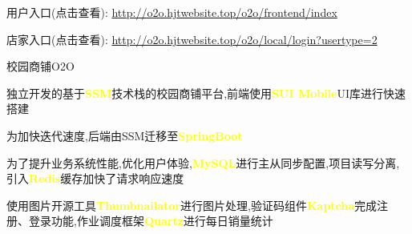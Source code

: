 

\begin{cventries}
	
	\cventry
	{用户入口(点击查看): \url{http://o2o.hjtwebsite.top/o2o/frontend/index} \item 
		店家入口(点击查看): \url{http://o2o.hjtwebsite.top/o2o/local/login?usertype=2}} %
	{校园商铺O2O} %
	{} %
	{} %
	{
		\begin{cvitems} %
			\item {独立开发的基于\textcolor{yellow}{\textbf{SSM}}技术栈的校园商铺平台,前端使用\textcolor{yellow}{\textbf{SUI Mobile}}UI库进行快速搭建}
			\item {为加快迭代速度,后端由SSM迁移至\textcolor{yellow}{\textbf{SpringBoot}}}
			\item {为了提升业务系统性能,优化用户体验,\textcolor{yellow}{\textbf{MySQL}}进行主从同步配置,项目读写分离,引入\textcolor{yellow}{\textbf{Redis}}缓存加快了请求响应速度}
			\item {使用图片开源工具\textcolor{yellow}{\textbf{Thumbnailator}}进行图片处理,验证码组件\textcolor{yellow}{\textbf{Kaptcha}}完成注册、登录功能,作业调度框架\textcolor{yellow}{\textbf{Quartz}}进行每日销量统计}
		\end{cvitems}
	}
	

\end{cventries}
